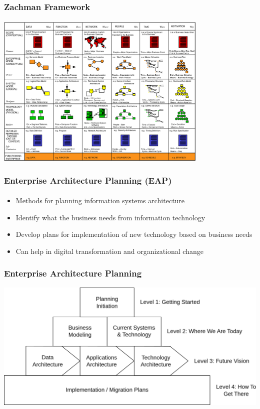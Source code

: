 \documentclass[aspectratio=169, table]{beamer}
\begin{document}
    {
        \begin{frame}
            \frametitle{Zachman Framework}
             \framesubtitle{\hspace{1cm}}
            \vspace{10pt}
            \begin{center}
                \includegraphics[width=0.76\textwidth]{../figures/zachman}
            \end{center}
        \end{frame}
    }

    \begin{frame}
        \frametitle{Enterprise Architecture Planning (EAP)}
        \framesubtitle{\hspace{1cm}}
        \begin{itemize}
            \item Methods for planning information systems architecture
            \item Identify what the business needs from information technology
            \item Develop plans for implementation of new technology based on business needs
            \item Can help in digital transformation and organizational change
        \end{itemize}
    \end{frame}

    {
        \begin{frame}
            \frametitle{Enterprise Architecture Planning}
            \begin{center}
                \includegraphics[width=1\textwidth]{../figures/eap}
            \end{center}
        \end{frame}
    }
\end{document}
